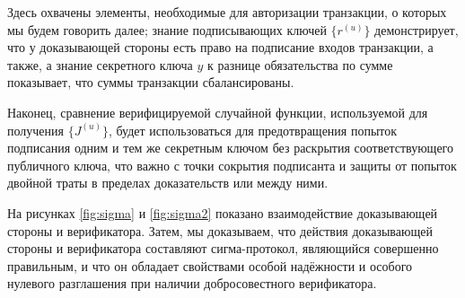 \documentclass{article}
\theoremstyle{definition}
\begin{document}
Здесь охвачены элементы, необходимые для авторизации транзакции, о которых мы будем говорить далее; знание подписывающих ключей $\{r^{(u)}\}$ демонстрирует, что у доказывающей стороны есть право на подписание входов транзакции, а также, а знание секретного ключа $y$ к разнице обязательства по сумме показывает, что суммы транзакции сбалансированы.

Наконец, сравнение верифицируемой случайной функции, используемой для получения $\{J^{(u)}\}$, будет использоваться для предотвращения попыток подписания одним и тем же секретным ключом без раскрытия соответствующего публичного ключа, что важно с точки сокрытия подписанта и защиты от попыток двойной траты в пределах доказательств или между ними.

На рисунках \ref{fig:sigma} и \ref{fig:sigma2} показано взаимодействие доказывающей стороны и верификатора. Затем, мы доказываем, что действия доказывающей стороны и верификатора составляют сигма-протокол, являющийся совершенно правильным, и что он обладает свойствами особой надёжности и особого нулевого разглашения при наличии добросовестного верификатора.
\end{document}
